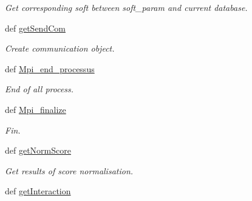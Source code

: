 \begin{DoxyCompactItemize}
\begin{DoxyCompactList}\small\item\em \-Get corresponding soft between soft\-\_\-param and current database. \end{DoxyCompactList}\item 
\hypertarget{classiRNA__stat_1_1Mpi_1_1Mpi_a8104d6d596ceab0bccf0cffbd35ef936}{
def \hyperlink{classiRNA__stat_1_1Mpi_1_1Mpi_a8104d6d596ceab0bccf0cffbd35ef936}{get\-Send\-Com}}
\label{classiRNA__stat_1_1Mpi_1_1Mpi_a8104d6d596ceab0bccf0cffbd35ef936}

\begin{DoxyCompactList}\small\item\em \-Create communication object. \end{DoxyCompactList}\item 
\hypertarget{classiRNA__stat_1_1Mpi_1_1Mpi_ab973a65afc4f886325fcb2df600426bf}{
def \hyperlink{classiRNA__stat_1_1Mpi_1_1Mpi_ab973a65afc4f886325fcb2df600426bf}{\-Mpi\-\_\-end\-\_\-processus}}
\label{classiRNA__stat_1_1Mpi_1_1Mpi_ab973a65afc4f886325fcb2df600426bf}

\begin{DoxyCompactList}\small\item\em \-End of all process. \end{DoxyCompactList}\item 
\hypertarget{classiRNA__stat_1_1Mpi_1_1Mpi_a5a264305a7e12f8f3a5509d41d3e49f6}{
def \hyperlink{classiRNA__stat_1_1Mpi_1_1Mpi_a5a264305a7e12f8f3a5509d41d3e49f6}{\-Mpi\-\_\-finalize}}
\label{classiRNA__stat_1_1Mpi_1_1Mpi_a5a264305a7e12f8f3a5509d41d3e49f6}

\begin{DoxyCompactList}\small\item\em \-Fin. \end{DoxyCompactList}\item 
\hypertarget{classiRNA__stat_1_1Mpi_1_1Mpi_ab198fa887d955aec6a9a798dc1462180}{
def \hyperlink{classiRNA__stat_1_1Mpi_1_1Mpi_ab198fa887d955aec6a9a798dc1462180}{get\-Norm\-Score}}
\label{classiRNA__stat_1_1Mpi_1_1Mpi_ab198fa887d955aec6a9a798dc1462180}

\begin{DoxyCompactList}\small\item\em \-Get results of score normalisation. \end{DoxyCompactList}\item 
\hypertarget{classiRNA__stat_1_1Mpi_1_1Mpi_a0f0b1b2a1e6faf0b17bdccabef0ee45d}{
def \hyperlink{classiRNA__stat_1_1Mpi_1_1Mpi_a0f0b1b2a1e6faf0b17bdccabef0ee45d}{get\-Interaction}}
\label{classiRNA__stat_1_1Mpi_1_1Mpi_a0f0b1b2a1e6faf0b17bdccabef0ee45d}


\end{DoxyCompactItemize}
